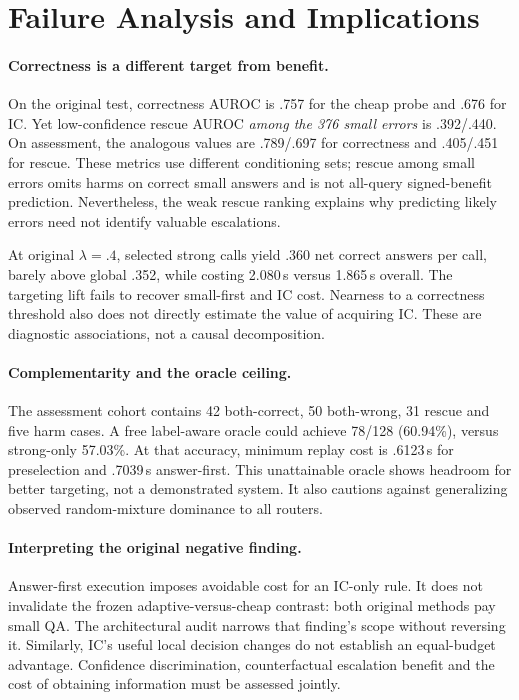 \documentclass[11pt]{article}
\begin{document}
\section{Failure Analysis and Implications}
\label{sec:failure}
\paragraph{Correctness is a different target from benefit.}
On the original test, correctness AUROC is .757 for the cheap probe and .676 for IC. Yet low-confidence rescue AUROC \emph{among the 376 small errors} is .392/.440. On assessment, the analogous values are .789/.697 for correctness and .405/.451 for rescue. These metrics use different conditioning sets; rescue among small errors omits harms on correct small answers and is not all-query signed-benefit prediction. Nevertheless, the weak rescue ranking explains why predicting likely errors need not identify valuable escalations.

At original $\lambda=.4$, selected strong calls yield .360 net correct answers per call, barely above global .352, while costing 2.080\,s versus 1.865\,s overall. The targeting lift fails to recover small-first and IC cost. Nearness to a correctness threshold also does not directly estimate the value of acquiring IC. These are diagnostic associations, not a causal decomposition.

\paragraph{Complementarity and the oracle ceiling.}
The assessment cohort contains 42 both-correct, 50 both-wrong, 31 rescue and five harm cases. A free label-aware oracle could achieve 78/128 (60.94\%), versus strong-only 57.03\%. At that accuracy, minimum replay cost is .6123\,s for preselection and .7039\,s answer-first. This unattainable oracle shows headroom for better targeting, not a demonstrated system. It also cautions against generalizing observed random-mixture dominance to all routers.

\paragraph{Interpreting the original negative finding.}
Answer-first execution imposes avoidable cost for an IC-only rule. It does not invalidate the frozen adaptive-versus-cheap contrast: both original methods pay small QA. The architectural audit narrows that finding's scope without reversing it. Similarly, IC's useful local decision changes do not establish an equal-budget advantage. Confidence discrimination, counterfactual escalation benefit and the cost of obtaining information must be assessed jointly.
\end{document}

